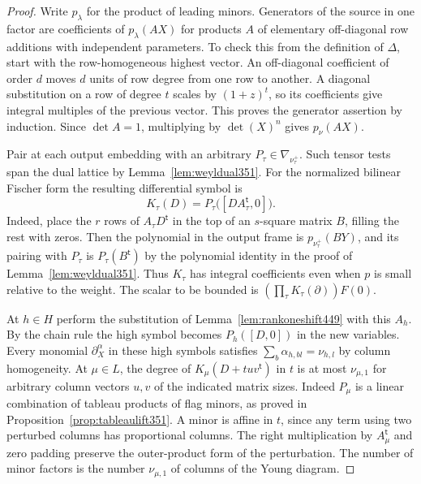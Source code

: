 \documentclass[a4paper,11pt]{article}
\theoremstyle{definition}
\theoremstyle{remark}
\numberwithin{equation}{section}
\begin{document}
\begin{proof}
Write \(p_\lambda\) for the product of leading minors. Generators
of the source in one factor are coefficients of \(p_\lambda(AX)\)
for products \(A\) of elementary off-diagonal row additions with
independent parameters. To check this from the definition of
\(\Delta\), start with the row-homogeneous highest vector.
An off-diagonal coefficient of order \(d\) moves \(d\) units of
row degree from one row to another. A diagonal substitution on a
row of degree \(t\) scales by \((1+z)^t\), so its coefficients
give integral multiples of the previous vector. This proves the
generator assertion by induction. Since \(\det A=1\), multiplying
by \(\det(X)^n\) gives \(p_\nu(AX)\).

Pair at each output embedding with an arbitrary
\(P_\tau\in\nabla_{\nu_\tau^+}\). Such tensor tests span the
dual lattice by Lemma~\ref{lem:weyldual351}. For the normalized
bilinear Fischer form the resulting differential symbol is
\[
 K_\tau(D)=P_\tau\big([D A_\tau^{\mathsf t},0]\big).
\]
Indeed, place the \(r\) rows of \(A_\tau D^{\mathsf t}\) in
the top of an \(s\)-square matrix \(B\), filling the rest with
zeros. Then the polynomial in the output frame is
\(p_{\nu_\tau^+}(BY)\), and its pairing with \(P_\tau\) is
\(P_\tau(B^{\mathsf t})\) by the polynomial identity in the
proof of Lemma~\ref{lem:weyldual351}. Thus \(K_\tau\) has
integral coefficients even when \(p\) is small relative to the
weight. The scalar to be bounded is
\((\prod_\tau K_\tau(\partial))F(0)\).

At \(h\in H\) perform the substitution of
Lemma~\ref{lem:rankoneshift449} with this \(A_h\). By the chain
rule the high symbol becomes \(P_h([D,0])\) in the new variables.
Every monomial \(\partial_X^\alpha\) in these high symbols
satisfies \(\sum_b\alpha_{h,bl}=\nu_{h,l}\) by column homogeneity.
At \(\mu\in L\), the degree of \(K_\mu(D+tuv^{\mathsf t})\) in
\(t\) is at most \(\nu_{\mu,1}\) for arbitrary column vectors
\(u,v\) of the indicated matrix sizes. Indeed \(P_\mu\) is a
linear combination of tableau products of flag minors, as proved
in Proposition~\ref{prop:tableaulift351}. A minor is affine in
\(t\), since any term using two perturbed columns has proportional
columns. The right multiplication by \(A_\mu^{\mathsf t}\) and
zero padding preserve the outer-product form of the perturbation.
The number of minor factors is the number \(\nu_{\mu,1}\) of
columns of the Young diagram.


\end{proof}
\end{document}
